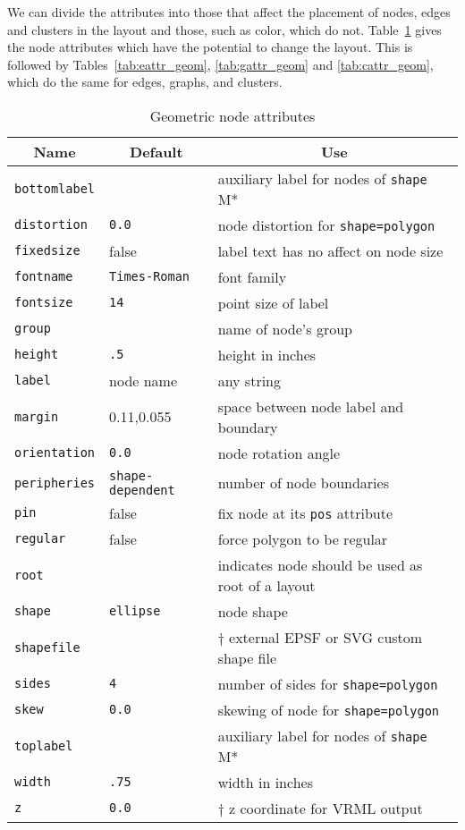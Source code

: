 We can divide the attributes into those that affect the placement
of nodes, edges and clusters in the layout and those, such as color, 
which do not. 
Table~\ref{tab:nattr_geom} gives the node attributes which have the potential
to change the layout. This is followed by Tables~\ref{tab:eattr_geom},
\ref{tab:gattr_geom} and \ref{tab:cattr_geom}, which do the same for 
edges, graphs, and clusters.
\begin{table}[htbp]\footnotesize
\centering
\begin{tabular}[t]{|l|l|p{2.5in}|} \hline
\multicolumn{1}{|c|}{Name} & \multicolumn{1}{c|}{Default} & \multicolumn{1}{c|}{Use} \\ \hline
{\tt bottomlabel} & & auxiliary label for nodes of {\tt shape} M* \\
{\tt distortion} & {\tt 0.0} & node distortion for {\tt shape=polygon} \\
{\tt fixedsize} & false & label text has no affect on node size \\
{\tt fontname} & {\tt Times-Roman} & font family \\
{\tt fontsize} & {\tt 14} & point size of label \\
{\tt group} &  & name of node's group \\
{\tt height} & {\tt .5} & height in inches \\
{\tt label} & node name & any string \\
{\tt margin} &  0.11,0.055 & space between node label and boundary \\
{\tt orientation} & {\tt 0.0} & node rotation angle \\
{\tt peripheries} & {\tt shape-dependent} & number of node boundaries \\
{\tt pin} & false & fix node at its {\tt pos} attribute \\
{\tt regular} & false & force polygon to be regular \\
{\tt root} & & indicates node should be used as root of a layout \\
{\tt shape} & {\tt ellipse} & node shape \\
{\tt shapefile} & & $\dagger$ external EPSF or SVG custom shape file\\
{\tt sides} & {\tt 4} & number of sides for {\tt shape=polygon} \\
{\tt skew} & {\tt 0.0} & skewing of node for {\tt shape=polygon} \\
{\tt toplabel} & & auxiliary label for nodes of {\tt shape} M* \\
{\tt width} & {\tt .75} & width in inches \\
{\tt z} & {\tt 0.0} & $\dagger$ z coordinate for VRML output \\
\hline
\end{tabular}
\caption{Geometric node attributes}
\label{tab:nattr_geom}
\end{table}
